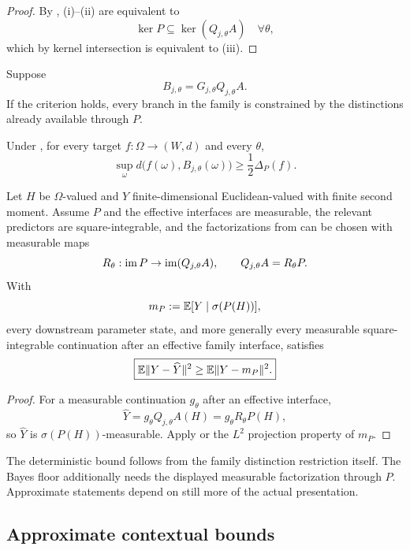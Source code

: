 \begin{proof}
By , (i)--(ii) are equivalent to
\[
\ker P\subseteq\ker(Q_{j,\theta}A)
\quad\forall\theta,
\]
which by kernel intersection is equivalent to (iii).
\end{proof}

Suppose
\[
B_{j,\theta}=G_{j,\theta}Q_{j,\theta}A.
\]
If the criterion holds, every branch in the family is constrained by the distinctions already available through $P$.

\begin{corollary}\label{cor:uniform-deterministic-v13}
Under , for every target $f:\Omega\to(W,d)$ and every $\theta$,
\[
\boxed{
\sup_\omega d\bigl(f(\omega),B_{j,\theta}(\omega)\bigr)
\ge
\frac12\Delta_P(f).
}
\]
\end{corollary}

\begin{corollary}\label{cor:uniform-bayes-v13}
Let $H$ be $\Omega$-valued and $Y$ finite-dimensional Euclidean-valued with finite second moment. Assume $P$ and the effective interfaces are measurable, the relevant predictors are square-integrable, and the factorizations from  can be chosen with measurable maps
\[
R_\theta:\operatorname{im} P\to\operatorname{im}(Q_{j,\theta}A),
\qquad
Q_{j,\theta}A=R_\theta P.
\]
With
\[
m_P:=\mathbb{E}[Y\mid\sigma(P(H))],
\]
every downstream parameter state, and more generally every measurable square-integrable continuation after an effective family interface, satisfies
\[
\boxed{
\mathbb{E}\|Y-\widehat Y\|^2
\ge
\mathbb{E}\|Y-m_P\|^2.
}
\]
\end{corollary}

\begin{proof}
For a measurable continuation $g_\theta$ after an effective interface,
\[
\widehat Y=g_\theta Q_{j,\theta}A(H)=g_\theta R_\theta P(H),
\]
so $\widehat Y$ is $\sigma(P(H))$-measurable. Apply  or the $L^2$ projection property of $m_P$.
\end{proof}

The deterministic bound follows from the family distinction restriction itself. The Bayes floor additionally needs the displayed measurable factorization through $P$. Approximate statements depend on still more of the actual presentation.

\subsection{Approximate contextual bounds}\label{subsec:approx-context-v13}

